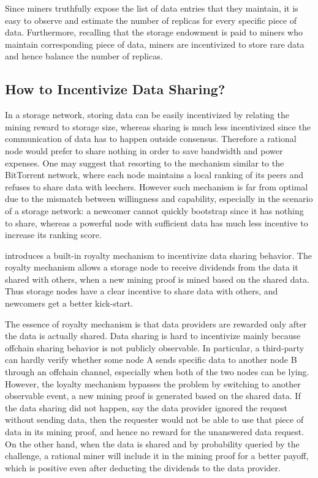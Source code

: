 Since miners truthfully expose the list of data entries that they maintain,
it is easy to observe and estimate the number of replicas for every specific piece of data.
Furthermore, recalling that the storage endowment is paid to miners who maintain corresponding piece of data,
miners are incentivized to store rare data and hence balance the number of replicas.





\subsection{How to Incentivize Data Sharing?}

In a storage network, storing data can be easily incentivized by relating the mining reward to storage size, whereas sharing is much less incentivized since the communication of data has to happen outside consensus. 
Therefore a rational node would prefer to share nothing in order to save bandwidth and power expenses.
One may suggest that resorting to the mechanism similar to the BitTorrent network, where each node maintains a local ranking of its peers and refuses to share data with leechers.
However such mechanism is far from optimal due to the mismatch between willingness and capability,
especially in the scenario of a storage network: 
a newcomer cannot quickly bootstrap since it has nothing to share, whereas a powerful node with sufficient data has much less incentive to increase its ranking score.

\project introduces a built-in royalty mechanism to incentivize data sharing behavior.
The royalty mechanism allows a storage node to receive dividends 
from the data it shared with others, 
when a new mining proof is mined based on the shared data.
Thus storage nodes have a clear incentive to share data with others, and newcomers get a better kick-start.

The essence of royalty mechanism is that data providers are rewarded only after the data is actually shared.
Data sharing is hard to incentivize mainly because offchain sharing behavior is not publicly observable.
In particular, a third-party can hardly verify whether some node A sends specific data to another node B through an offchain channel,
especially when both of the two nodes can be lying.
However, the \project loyalty mechanism bypasses the problem by switching to another observable event, \ie a new mining proof is generated based on the shared data.
If the data sharing did not happen, say the data provider ignored the request without sending data, then the requester would not be able to use that piece of data in its mining proof, and hence no reward for the unanswered data request.
On the other hand, when the data is shared and by probability queried by the \sproof challenge, a rational miner will include it in the mining proof for a better payoff, which is positive even after deducting the dividends to the data provider.

